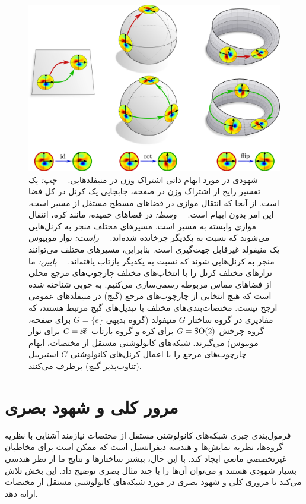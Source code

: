 

\newpage


\begin{figure}
	\centering
	\includegraphics[width=.93\columnwidth]{figures/intro_transport_ambiguity.pdf}
	\caption{\small
		شهودی در مورد ابهام ذاتی اشتراک وزن در منیفلدهایی.
		\ \ \emph{چپ:}
		یک تفسیر رایج از اشتراک وزن در صفحه، جابجایی یک کرنل در کل فضا است.
		از آنجا که انتقال موازی در فضاهای مسطح مستقل از مسیر است، این امر بدون ابهام است.
		\ \ \emph{وسط:}
		در فضاهای خمیده، مانند کره، انتقال موازی وابسته به مسیر است.
		مسیرهای مختلف منجر به کرنل‌هایی می‌شوند که نسبت به یکدیگر چرخانده شده‌اند.
		\ \ \emph{راست:}
		نوار موبیوس یک منیفولد غیرقابل جهت‌گیری است.
		بنابراین، مسیرهای مختلف می‌توانند منجر به کرنل‌هایی شوند که نسبت به یکدیگر بازتاب یافته‌اند.
		\ \ \emph{پایین:}
		ما ترازهای مختلف کرنل را با انتخاب‌های مختلف چارچوب‌های مرجع محلی از فضاهای مماس مربوطه رسمی‌سازی می‌کنیم.
		به خوبی شناخته شده است که هیچ انتخابی از چارچوب‌های مرجع (گیج) در منیفلدهای عمومی ارجح نیست.
		مختصات‌بندی‌های مختلف با تبدیل‌های گیج مرتبط هستند، که مقادیری در گروه ساختار $G$ منیفولد (گروه بدیهی $G=\{e\}$ برای صفحه، گروه چرخش $G=\operatorname{SO}(2)$ برای کره و گروه بازتاب $G = \mathscr{R}$ برای نوار موبیوس) می‌گیرند.
		شبکه‌های کانولوشنی مستقل از مختصات، ابهام چارچوب‌های مرجع را با اعمال کرنل‌های کانولوشنی $G$-استیریبل (تناوب‌پذیر گیج) برطرف می‌کنند.
	}
	\label{fig:weight_sharing_ambiguity}
\end{figure}


\section{مرور کلی و شهود بصری}
\label{sec:visual_intro}


فرمول‌بندی جبری شبکه‌های کانولوشنی مستقل از مختصات نیازمند آشنایی با نظریه گروه‌ها، نظریه نمایش‌ها و هندسه دیفرانسیل است که ممکن است برای مخاطبان غیرتخصصی مانعی ایجاد کند.
با این حال، بیشتر ساختارها و نتایج ما از نظر هندسی بسیار شهودی هستند و می‌توان آن‌ها را با چند مثال بصری توضیح داد.
این بخش تلاش می‌کند تا مروری کلی و شهود بصری در مورد شبکه‌های کانولوشنی مستقل از مختصات ارائه دهد.

